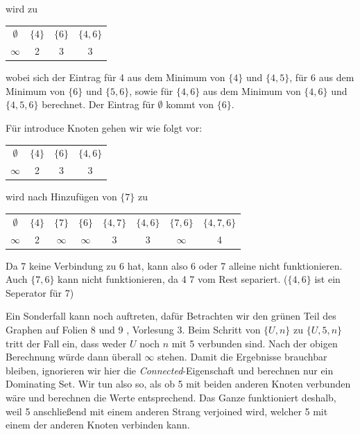 wird zu

\begin{center}
\begin{tabular}{c c c c}
    $\emptyset$ & $\{4\}$ & $\{6\}$ & $\{4,6\}$\\
    $\infty$ & 2 & 3 & 3\\
\end{tabular}
\end{center}

wobei sich der Eintrag für 4 aus dem Minimum von $\{4\}$ und $\{4,5\}$,
für 6 aus dem Minimum von $\{6\}$ und $\{5,6\}$, sowie für $\{4,6\}$ aus dem Minimum von $\{4,6\}$ und $\{4,5,6\}$ berechnet.
Der Eintrag für $\emptyset$ kommt von $\{6\}$.

Für introduce Knoten gehen wir wie folgt vor:

\begin{center}
\begin{tabular}{c c c c}
    $\emptyset$ & $\{4\}$ & $\{6\}$ & $\{4,6\}$\\
    $\infty$ & 2 & 3 & 3\\
\end{tabular}
\end{center}

wird nach Hinzufügen von $\{7\}$ zu

\begin{center}
\begin{tabular}{c c c c c c c c}
    $\emptyset$ & $\{4\}$ & $\{7\}$ & $\{6\}$ & $\{4,7\}$ &$\{4,6\}$ &$\{7,6\}$ &$\{4,7,6\}$\\
    $\infty$ & 2 & $\infty$ & $\infty$ & 3 & 3 & $\infty$ & 4\\
\end{tabular}
\end{center}

Da 7 keine Verbindung zu 6 hat, kann also 6 oder 7 alleine nicht funktionieren. Auch $\{7,6\}$ kann nicht funktionieren, da 4 7 vom Rest separiert. ($\{4,6\}$ ist ein Seperator für 7)

Ein Sonderfall kann noch auftreten, dafür Betrachten wir den grünen Teil des Graphen auf Folien 8 und 9 , Vorlesung 3.
Beim Schritt von $\{U,n\}$ zu $\{U,5,n\}$ tritt der Fall ein, dass weder $U$ noch $n$ mit 5 verbunden sind. Nach der obigen Berechnung würde dann überall $\infty$ stehen.
Damit die Ergebnisse brauchbar bleiben, ignorieren wir hier die \emph{Connected}-Eigenschaft und berechnen nur ein Dominating Set. Wir tun also so, als ob 5 mit beiden anderen Knoten verbunden wäre und berechnen die Werte entsprechend.
Das Ganze funktioniert deshalb, weil 5 anschließend mit einem anderen Strang verjoined wird, welcher 5 mit einem der anderen Knoten verbinden kann.


